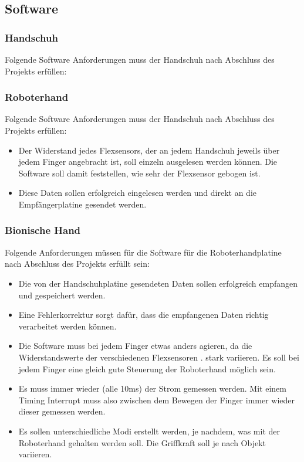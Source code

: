 \documentclass[11pt]{article}
\begin{document}
\subsection{Software}
\subsubsection{Handschuh}
Folgende Software Anforderungen muss der Handschuh nach Abschluss des Projekts erfüllen:

\subsubsection{Roboterhand}
Folgende Software Anforderungen muss der Handschuh nach Abschluss des Projekts erfüllen:

	\begin{itemize}
		\item Der Widerstand jedes Flexsensors, der an jedem Handschuh jeweils über jedem Finger angebracht ist, 
			  soll einzeln ausgelesen werden können. Die Software soll damit feststellen, wie sehr der Flexsensor 
			  gebogen ist.
		\item Diese Daten sollen erfolgreich eingelesen werden und direkt an die Empfängerplatine gesendet werden.
	\end{itemize}

\subsubsection{Bionische Hand}
Folgende Anforderungen müssen für die Software für die Roboterhandplatine nach Abschluss des Projekts erfüllt sein:

	\begin{itemize}
		\item Die von der Handschuhplatine gesendeten Daten sollen erfolgreich empfangen und gespeichert werden.
		\item Eine Fehlerkorrektur sorgt dafür, dass die empfangenen Daten richtig verarbeitet werden können.
		\item Die Software muss bei jedem Finger etwas anders agieren, da die Widerstandswerte der verschiedenen 
		      Flexsensoren .
			  stark variieren. Es soll bei jedem Finger eine gleich gute Steuerung der Roboterhand möglich sein.
		\item Es muss immer wieder (alle 10ms) der Strom gemessen werden. Mit einem Timing Interrupt muss also zwischen 
		      dem Bewegen der Finger immer wieder dieser gemessen werden.
		\item Es sollen unterschiedliche Modi erstellt werden, je nachdem, was mit der Roboterhand gehalten werden soll. 
			  Die Griffkraft soll je nach Objekt variieren.
	\end{itemize}
\end{document}
